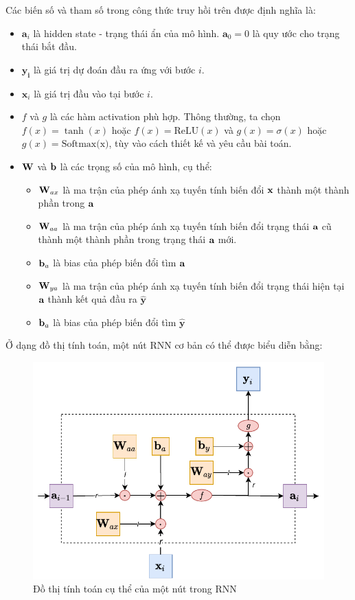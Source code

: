 Các biến số và tham số trong công thức truy hồi trên được định nghĩa là:
\begin{itemize}
    \item $\bm a_i$ là hidden state - trạng thái ẩn của mô hình. $\bm a_0 = 0$ là quy ước cho trạng thái bắt đầu.
    \item $\bm{\hat{y_i}}$ là giá trị dự đoán đầu ra ứng với bước $i$.
    \item $\bm x_i$ là giá trị đầu vào tại bước $i$.
    \item $f$ và $g$ là các hàm activation phù hợp. Thông thường, ta chọn $f(x) = \tanh(x)$ hoặc $f(x) = \textrm{ReLU}(x)$ và $g(x) = \sigma (x)$ hoặc $g(x) = \textrm{Softmax(x)}$, tùy vào cách thiết kế và yêu cầu bài toán.
    \item $\textbf W$ và $\textbf b$ là các trọng số của mô hình, cụ thể:
          \begin{itemize}
              \item $\textbf W_{ax}$ là ma trận của phép ánh xạ tuyến tính biến đổi $\textbf x$ thành một thành phần trong $\textbf a$
              \item $\textbf W_{aa}$ là ma trận của phép ánh xạ tuyến tính biến đổi trạng thái $\textbf a$ cũ thành một thành phần trong trạng thái $\textbf a$ mới.
              \item $\textbf b_a$ là bias của phép biến đổi tìm $\textbf a$
              \item $\textbf W_{ya}$ là ma trận của phép ánh xạ tuyến tính biến đổi trạng thái hiện tại $\textbf a$ thành kết quả đầu ra $\hat{\textbf{y}}$
              \item $\textbf b_a$ là bias của phép biến đổi tìm $\hat{\textbf{y}}$
          \end{itemize}
\end{itemize}
Ở dạng đồ thị tính toán, một nút RNN cơ bản có thể được biểu diễn bằng:
\begin{figure}[H]
    \centering
    \includegraphics[width=\textwidth,height=\textheight,keepaspectratio]{chapter06/figure-sec2345/rnn_elman.pdf}
    \caption{Đồ thị tính toán cụ thể của một nút trong RNN}
\end{figure}

